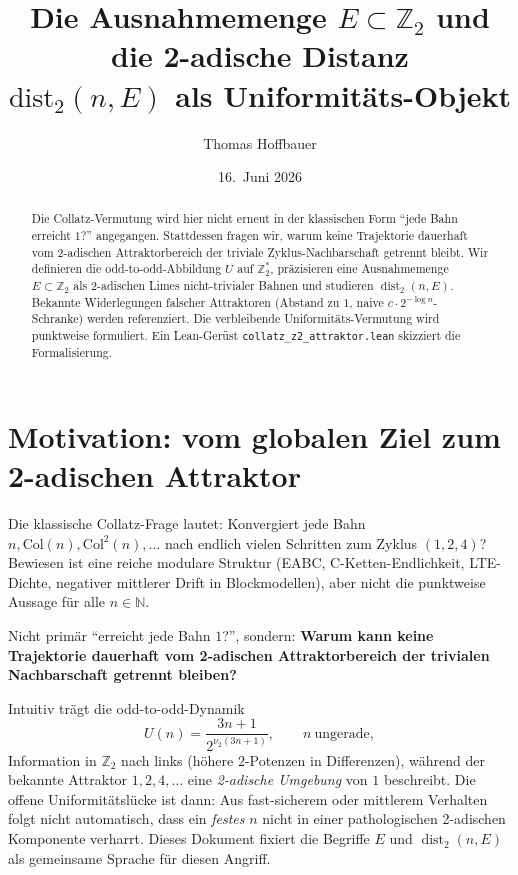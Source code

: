 \documentclass[12pt,a4paper]{article}
\title{%
  Die Ausnahmemenge $E\subset\mathbb{Z}_2$ und die 2-adische Distanz\\
  $\mathrm{dist}_2(n,E)$ als Uniformitäts-Objekt
}
\author{Thomas Hoffbauer}
\date{16.\ Juni 2026}
\newcommand{\vii}{\nu_2}
\newcommand{\N}{\mathbb{N}}
\newcommand{\Ztwo}{\mathbb{Z}_2}
\newcommand{\Ztwost}{\mathbb{Z}_2^{\ast}}
\newcommand{\Col}{\mathrm{Col}}
\newcommand{\disttwo}{\operatorname{dist}_2}
\begin{document}
\maketitle

\begin{abstract}
Die Collatz-Vermutung wird hier nicht erneut in der klassischen Form
``jede Bahn erreicht $1$?'' angegangen.
Stattdessen fragen wir, warum keine Trajektorie dauerhaft vom
2-adischen Attraktorbereich der triviale Zyklus-Nachbarschaft getrennt bleibt.
Wir definieren die odd-to-odd-Abbildung $U$ auf $\Ztwost$,
präzisieren eine Ausnahmemenge $E\subset\Ztwo$ als 2-adischen Limes
nicht-trivialer Bahnen und studieren $\disttwo(n,E)$.
Bekannte Widerlegungen falscher Attraktoren (Abstand zu $1$, naive
$c\cdot 2^{-\log n}$-Schranke) werden referenziert.
Die verbleibende Uniformitäts-Vermutung wird punktweise formuliert.
Ein Lean-Gerüst \texttt{collatz\_z2\_attraktor.lean} skizziert die Formalisierung.
\end{abstract}

\tableofcontents
\newpage

\section{Motivation: vom globalen Ziel zum 2-adischen Attraktor}
\label{sec:motivation}

Die klassische Collatz-Frage lautet: Konvergiert jede Bahn $n,\Col(n),\Col^2(n),\ldots$
nach endlich vielen Schritten zum Zyklus $(1,2,4)$?
Bewiesen ist eine reiche modulare Struktur (EABC, C-Ketten-Endlichkeit,
LTE-Dichte, negativer mittlerer Drift in Blockmodellen), aber nicht die
punktweise Aussage f\"ur alle $n\in\N$.

\begin{tcolorbox}[kern,title={Verschiebung der Leitfrage}]
Nicht prim\"ar ``erreicht jede Bahn $1$?'',
sondern: \textbf{Warum kann keine Trajektorie dauerhaft vom 2-adischen
Attraktorbereich der trivialen Nachbarschaft getrennt bleiben?}
\end{tcolorbox}

Intuitiv tr\"agt die odd-to-odd-Dynamik
\[
  U(n)=\frac{3n+1}{2^{\vii(3n+1)}},\qquad n\ \text{ungerade},
\]
Information in $\Ztwo$ nach links (h\"ohere $2$-Potenzen in Differenzen),
w\"ahrend der bekannte Attraktor $1,2,4,\ldots$ eine \emph{2-adische Umgebung}
von $1$ beschreibt.
Die offene Uniformit\"atsl\"ucke ist dann: Aus fast-sicherem oder
mittlerem Verhalten folgt nicht automatisch, dass ein \emph{festes} $n$
nicht in einer pathologischen 2-adischen Komponente verharrt.
Dieses Dokument fixiert die Begriffe $E$ und $\disttwo(n,E)$ als
gemeinsame Sprache f\"ur diesen Angriff.
\end{document}

